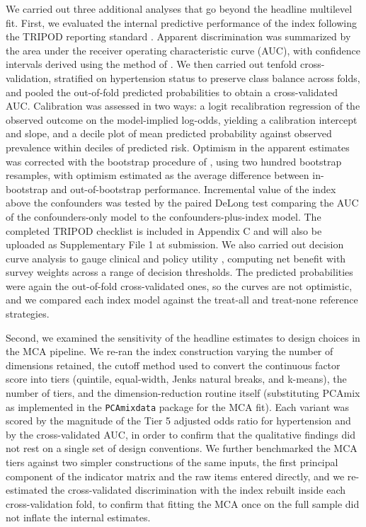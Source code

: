 \documentclass[
  12pt,
  a4paper]{article}
\newcounter{none} %
\begin{document}
We carried out three additional analyses that go beyond the headline multilevel fit. First, we evaluated the internal predictive performance of the index following the TRIPOD reporting standard \citep{moons_tripod_2015}. Apparent discrimination was summarized by the area under the receiver operating characteristic curve (AUC), with confidence intervals derived using the method of \citet{delong_areas_1988}. We then carried out tenfold cross-validation, stratified on hypertension status to preserve class balance across folds, and pooled the out-of-fold predicted probabilities to obtain a cross-validated AUC. Calibration was assessed in two ways: a logit recalibration regression of the observed outcome on the model-implied log-odds, yielding a calibration intercept and slope, and a decile plot of mean predicted probability against observed prevalence within deciles of predicted risk. Optimism in the apparent estimates was corrected with the bootstrap procedure of \citet{harrell_regression_2015}, using two hundred bootstrap resamples, with optimism estimated as the average difference between in-bootstrap and out-of-bootstrap performance. Incremental value of the index above the confounders was tested by the paired DeLong test comparing the AUC of the confounders-only model to the confounders-plus-index model. The completed TRIPOD checklist is included in Appendix C and will also be uploaded as Supplementary File 1 at submission. We also carried out decision curve analysis to gauge clinical and policy utility \citep{vickers_decision_2006}, computing net benefit with survey weights across a range of decision thresholds. The predicted probabilities were again the out-of-fold cross-validated ones, so the curves are not optimistic, and we compared each index model against the treat-all and treat-none reference strategies.

Second, we examined the sensitivity of the headline estimates to design choices in the MCA pipeline. We re-ran the index construction varying the number of dimensions retained, the cutoff method used to convert the continuous factor score into tiers (quintile, equal-width, Jenks natural breaks, and k-means), the number of tiers, and the dimension-reduction routine itself (substituting PCAmix as implemented in the \texttt{PCAmixdata} package for the MCA fit). Each variant was scored by the magnitude of the Tier 5 adjusted odds ratio for hypertension and by the cross-validated AUC, in order to confirm that the qualitative findings did not rest on a single set of design conventions. We further benchmarked the MCA tiers against two simpler constructions of the same inputs, the first principal component of the indicator matrix and the raw items entered directly, and we re-estimated the cross-validated discrimination with the index rebuilt inside each cross-validation fold, to confirm that fitting the MCA once on the full sample did not inflate the internal estimates.
\end{document}
